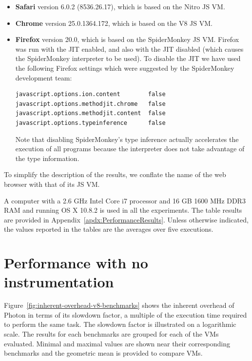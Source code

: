\begin{itemize}

\item
{\bf Safari} version 6.0.2 (8536.26.17), which is based on the Nitro JS VM.

\item
{\bf Chrome} version 25.0.1364.172, which is based on the V8 JS VM.

\item
{\bf Firefox} version 20.0, which is based on the SpiderMonkey
JS VM.  Firefox was run with the JIT enabled, and also with
the JIT disabled (which causes the SpiderMonkey interpreter to be
used).  To disable the JIT we have used the following Firefox settings
which were suggested by the SpiderMonkey development team:

{\small
\begin{verbatim}
javascript.options.ion.content        false
javascript.options.methodjit.chrome   false 
javascript.options.methodjit.content  false
javascript.options.typeinference      false
\end{verbatim}
}

Note that disabling SpiderMonkey's type inference actually
accelerates the execution of all programs because the interpreter does
not take advantage of the type information.

\end{itemize}

To simplify the description of the results, we conflate the name of
the web browser with that of its JS VM.

A computer with a 2.6 GHz Intel Core i7 processor and 16 GB 1600 MHz
DDR3 RAM and running OS X 10.8.2 is used in all the experiments.
The table results are provided in Appendix~\ref{apdx:PerformanceResults}.
Unless otherwise indicated, the values reported in the tables are the
averages over five executions.

\section{Performance with no instrumentation}

Figure~\ref{fig:inherent-overhead-v8-benchmarks} shows the inherent overhead of
Photon in terms of its slowdown factor, a multiple of the execution time
required to perform the same task. The slowdown factor is illustrated on a
logarithmic scale. The results for each benchmarks are grouped for each of the
VMs evaluated. Minimal and maximal values are shown near their corresponding
benchmarks and the geometric mean is provided to compare VMs.

